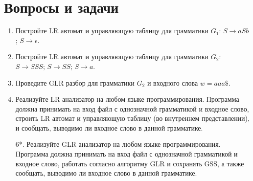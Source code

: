 \section{Вопросы и задачи}
\begin{enumerate}
    \item Постройте LR автомат и управляющую таблицу для грамматики $G_1$: $S \to a S b$; $S \to \epsilon$.
    \item Постройте LR автомат и управляющую таблицу для грамматики $G_2$: $S \to S S S$; $S \to S S$; $S \to a$.
    \item Проведите GLR разбор для грамматики $G_2$ и входного слова $w = aaa\$$.
    \item Реализуйте LR анализатор на любом языке программирования. Программа должна принимать на вход файл с однозначной грамматикой и входное слово, строить LR автомат и управляющую таблицу (во внутреннем представлении), и сообщать, выводимо ли входное слово в данной грамматике.
    \item[6*.] Реализуйте GLR анализатор на любом языке программирования. Программа должна принимать на вход файл с однозначной грамматикой и входное слово, работать согласно алгоритму GLR и сохранять GSS, а также сообщать, выводимо ли входное слово в данной грамматике.
\end{enumerate}
